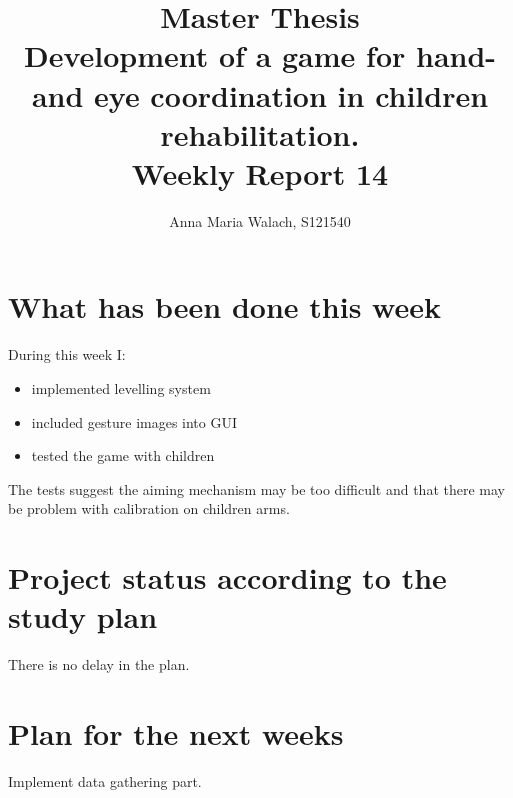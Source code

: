 \documentclass[10pt,a4paper]{article}
\title{{Master Thesis\\[0.5em]}
       {\bf \huge Development of a game for hand- and eye coordination in children rehabilitation.\\[0.5em]}
       {\bf Weekly Report 14}}
\author{Anna Maria Walach, S121540}
\begin{document}
\maketitle

\section*{What has been done this week}
During this week I:
\begin{itemize}
\item implemented levelling system
\item included gesture images into GUI
\item tested the game with children
\end{itemize}

The tests suggest the aiming mechanism may be too difficult and that there may be problem with calibration on children arms. 
\section*{Project status according to the study plan}
There is no delay in the plan.

\section*{Plan for the next weeks}
Implement data gathering part. 



\end{document}
